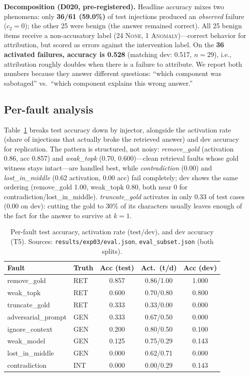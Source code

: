 \documentclass[conference]{IEEEtran}
\begin{document}
\textbf{Decomposition (D020, pre-registered).} Headline accuracy mixes two
phenomena: only \textbf{36/61 (59.0\%)} of test injections produced an
\emph{observed} failure ($c_2{=}0$); the other 25 were benign (the answer
remained correct). All 25 benign items receive a non-accusatory label (24
\textsc{None}, 1 \textsc{Anomaly})---correct behavior for attribution, but
scored as errors against the intervention label. On the \textbf{36 activated
failures, accuracy is 0.528} (matching dev: 0.517, $n{=}29$), i.e.,
attribution roughly doubles when there is a failure to attribute. We report
both numbers because they answer different questions: ``which component was
sabotaged'' vs.\ ``which component explains this wrong answer.''

\subsection{Per-fault analysis}
\label{sec:perfault}
Table~\ref{tab:perfault} breaks test accuracy down by injector, alongside
the activation rate (share of injections that actually broke the retrieved
answer) and dev accuracy for replication. The pattern is structured, not
noisy: \emph{remove\_gold} (activation 0.86, acc 0.857) and \emph{weak\_topk}
(0.70, 0.600)---clean retrieval faults whose gold witness stays
intact---are handled best, while \emph{contradiction} (0.00) and
\emph{lost\_in\_middle} (0.62 activation, 0.00 acc) fail completely;
dev shows the same ordering (remove\_gold 1.00, weak\_topk 0.80, both
near 0 for contradiction/lost\_in\_middle). \emph{truncate\_gold}
activates in only 0.33 of test cases (0.00 on dev): cutting the gold to
30\% of its characters usually leaves enough of the fact for the answer to
survive at $k{=}1$.

\begin{table}[t]
\caption{Per-fault test accuracy, activation rate (test/dev), and dev
accuracy (T5). Sources: \texttt{results/exp03/eval.json},
\texttt{eval\_subset.json} (both splits).}
\label{tab:perfault}
\small
\setlength{\tabcolsep}{4pt}
\begin{tabular}{llccc}
\toprule
Fault & Truth & Acc (test) & Act.\ (t/d) & Acc (dev) \\
\midrule
remove\_gold & RET & 0.857 & 0.86/1.00 & 1.000 \\
weak\_topk & RET & 0.600 & 0.70/0.80 & 0.800 \\
truncate\_gold & RET & 0.333 & 0.33/0.00 & 0.000 \\
adversarial\_prompt & GEN & 0.333 & 0.67/0.50 & 0.000 \\
ignore\_context & GEN & 0.200 & 0.80/0.50 & 0.100 \\
weak\_model & GEN & 0.125 & 0.75/0.29 & 0.143 \\
lost\_in\_middle & GEN & 0.000 & 0.62/0.71 & 0.000 \\
contradiction & INT & 0.000 & 0.00/0.29 & 0.143 \\
\bottomrule
\end{tabular}
\end{table}
\end{document}
